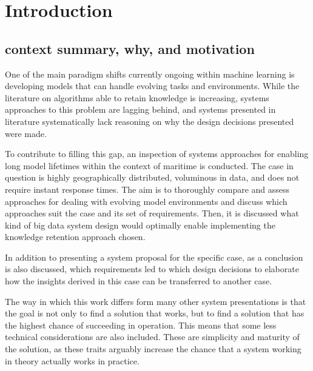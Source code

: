 \chapter{Introduction}

\section{context summary, why, and motivation}

One of the main paradigm shifts currently ongoing within machine learning is developing models that can handle evolving tasks and environments. While the literature on algorithms able to retain knowledge is increasing, systems approaches to this problem are lagging behind, and systems presented in literature systematically lack reasoning on why the design decisions presented were made.

To contribute to filling this gap, an inspection of systems approaches for enabling long model lifetimes within the context of maritime is conducted. The case in question is highly geographically distributed, voluminous in data, and does not require instant response times. The aim is to thoroughly compare and assess approaches for dealing with evolving model environments and discuss which approaches suit the case and its set of requirements. Then, it is discussed what kind of big data system design would optimally enable implementing the knowledge retention approach chosen.

In addition to presenting a system proposal for the specific case, as a conclusion is also discussed, which requirements led to which design decisions to elaborate how the insights derived in this case can be transferred to another case.

The way in which this work differs form many other system presentations is that the goal is not only to find a solution that works, but to find a solution that has the highest chance of succeeding in operation. This means that some less technical considerations are also included. These are simplicity and maturity of the solution, as these traits arguably increase the chance that a system working in theory actually works in practice.



